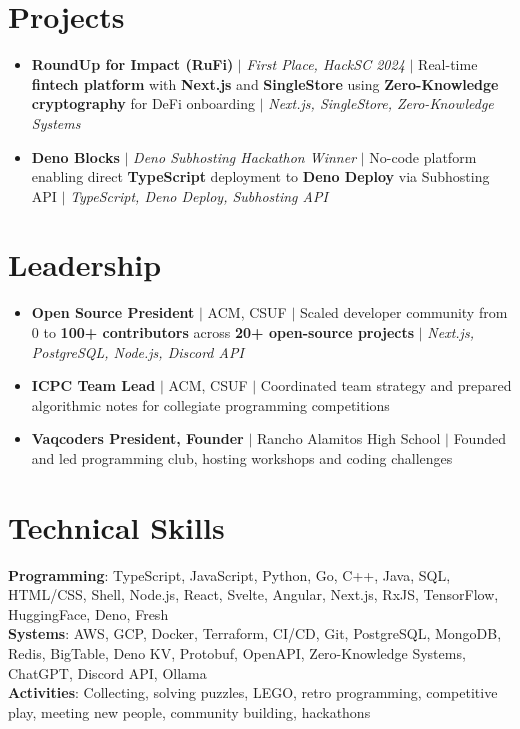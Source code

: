 \documentclass[letterpaper,12pt]{article}
\newcommand{\resumeItem}[1]{
  \item\small{
    {#1 \vspace{-2pt}}
  }
}
\newcommand{\resumeSubHeadingListStart}{\begin{itemize}[leftmargin=0.15in, label={}]}
\newcommand{\resumeSubHeadingListEnd}{\end{itemize}}
\begin{document}
\section{Projects}
\resumeSubHeadingListStart
  \resumeItem{\textbf{RoundUp for Impact (RuFi)} $|$ \emph{First Place, HackSC 2024} $|$ Real-time \textbf{fintech platform} with \textbf{Next.js} and \textbf{SingleStore} using \textbf{Zero-Knowledge cryptography} for DeFi onboarding $|$ \textit{Next.js, SingleStore, Zero-Knowledge Systems}}
  \resumeItem{\textbf{Deno Blocks} $|$ \emph{Deno Subhosting Hackathon Winner} $|$ No-code platform enabling direct \textbf{TypeScript} deployment to \textbf{Deno Deploy} via Subhosting API $|$ \textit{TypeScript, Deno Deploy, Subhosting API}}
\resumeSubHeadingListEnd

\section{Leadership}
\resumeSubHeadingListStart
  \resumeItem{\textbf{Open Source President} $|$ ACM, CSUF $|$ Scaled developer community from 0 to \textbf{100+ contributors} across \textbf{20+ open-source projects} $|$ \textit{Next.js, PostgreSQL, Node.js, Discord API}}
  \resumeItem{\textbf{ICPC Team Lead} $|$ ACM, CSUF $|$ Coordinated team strategy and prepared algorithmic notes for collegiate programming competitions}
  \resumeItem{\textbf{Vaqcoders President, Founder} $|$ Rancho Alamitos High School $|$ Founded and led programming club, hosting workshops and coding challenges}
\resumeSubHeadingListEnd

\section{Technical Skills}
\begin{itemize}[leftmargin=0.15in, label={}]
    \resumeItem{\item{
      \textbf{Programming}{: TypeScript, JavaScript, Python, Go, C++, Java, SQL, HTML/CSS, Shell, Node.js, React, Svelte, Angular, Next.js, RxJS, TensorFlow, HuggingFace, Deno, Fresh} \\
      \textbf{Systems}{: AWS, GCP, Docker, Terraform, CI/CD, Git, PostgreSQL, MongoDB, Redis, BigTable, Deno KV, Protobuf, OpenAPI, Zero-Knowledge Systems, ChatGPT, Discord API, Ollama} \\
      \textbf{Activities}{: Collecting, solving puzzles, LEGO, retro programming, competitive play, meeting new people, community building, hackathons}
    }}
 \end{itemize}

\end{document}
